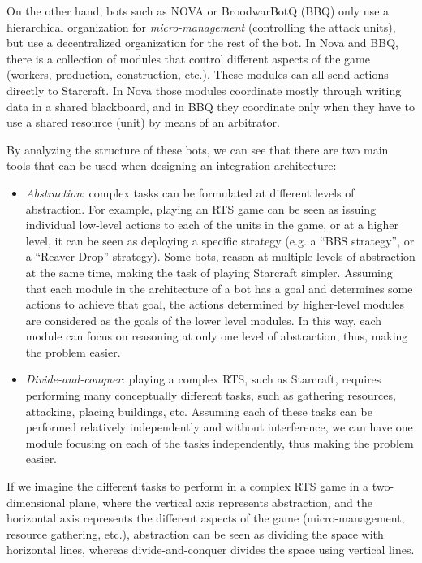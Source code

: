 \documentclass[journal]{IEEEtran}
\begin{document}
On the other hand, bots such as NOVA or BroodwarBotQ (BBQ) only use a hierarchical organization for {\em micro-management} (controlling the attack units), but use a decentralized organization for the rest of the bot. In Nova and BBQ, there is a collection of modules that control different aspects of the game (workers, production, construction, etc.). These modules can all send actions directly to Starcraft. In Nova those modules coordinate mostly through writing data in a shared blackboard, and in BBQ they coordinate only when they have to use a shared resource (unit) by means of an arbitrator.

By analyzing the structure of these bots, we can see that there are two main tools that can be used when designing an integration architecture:

\begin{itemize}
\item {\em Abstraction}: complex tasks can be formulated at different levels of abstraction. For example, playing an RTS game can be seen as issuing individual low-level actions to each of the units in the game, or at a higher level, it can be seen as deploying a specific strategy (e.g. a ``BBS strategy'', or a ``Reaver Drop'' strategy). Some bots, reason at multiple levels of abstraction at the same time, making the task of playing Starcraft simpler. Assuming that each module in the architecture of a bot has a goal and determines some actions to achieve that goal, the actions determined by higher-level modules are considered as the goals of the lower level modules. In this way, each module can focus on reasoning at only one level of abstraction, thus, making the problem easier.

\item {\em Divide-and-conquer}: playing a complex RTS, such as Starcraft, requires performing many conceptually different tasks, such as gathering resources, attacking, placing buildings, etc. Assuming each of these tasks can be performed relatively independently and without interference, we can have one module focusing on each of the tasks independently, thus making the problem easier. 
\end{itemize}

If we imagine the different tasks to perform in a complex RTS game in a two-dimensional plane, where the vertical axis represents abstraction, and the horizontal axis represents the different aspects of the game (micro-management, resource gathering, etc.), abstraction can be seen as dividing the space with horizontal lines, whereas divide-and-conquer divides the space using vertical lines.
\end{document}
